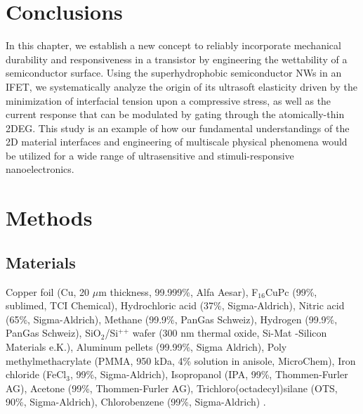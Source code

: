 \section{Conclusions}
\label{sec:small-conclusions}

In this chapter, we establish a new concept to reliably incorporate
mechanical durability and responsiveness in a transistor by
engineering the wettability of a semiconductor surface. Using the
superhydrophobic semiconductor NWs in an IFET, we systematically
analyze the origin of its ultrasoft elasticity driven by the
minimization of interfacial tension upon a compressive stress, as well
as the current response that can be modulated by gating through the
atomically-thin 2DEG.
%
This study is an example of how our fundamental understandings of the
2D material interfaces and engineering of multiscale physical
phenomena would be utilized for a wide range of ultrasensitive and
stimuli-responsive nano\-electronics.




\section{Methods}
\label{sec:small-method}

\subsection{Materials}
\label{sec:small-org2cee247}
Copper foil (Cu, 20 \(\mu \mathrm{m}\) thickness, 99.999\%, Alfa Aesar),
F\(_{\text{16}}\)CuPc (99\%, sublimed, TCI Chemical), Hydrochloric acid (37\%,
Sigma-Aldrich), Nitric acid (65\%, Sigma-Aldrich), Methane (99.9\%,
PanGas Schweiz), Hydrogen (99.9\%, PanGas Schweiz), SiO\(_{\text{2}}\)/Si\(^{\text{++}}\)
wafer (300 nm thermal oxide, Si-Mat -Silicon Materials e.K.), Aluminum
pellets (99.99\%, Sigma Aldrich), Poly methylmethacrylate (PMMA, 950
kDa, 4\% solution in anisole, MicroChem), Iron chloride (FeCl\(_{\text{3}}\), 99\%,
Sigma-Aldrich), Isopropanol (IPA, 99\%, Thommen-Furler AG), Acetone
(99\%, Thommen-Furler AG), Trichloro(octadecyl)silane (OTS, 90\%,
Sigma-Aldrich), Chlorobenzene (99\%, Sigma-Aldrich) .

